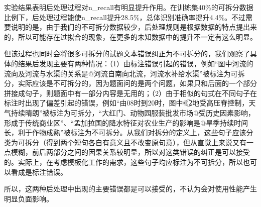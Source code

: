 \documentclass[master, winfont]{njuthesis}
\begin{document}
实验结果表明后处理过程对n\_recall有明显提升作用。在训练集40\%的可拆分数据比例下，后处理过程能使n\_recall提升28.5\%，总体识别准确率提升4.4\%。不过需要说明的是，由于我们的不可拆分数据较少，后处理规则是根据数据的特点提出来的，所以可能存在过拟合的现象，在更多的未知数据中的提升不一定有这么明显。

\begin{center}
\begin{table}[!htbp]
\caption{\label{postprocess} 后处理的影响}
\end{table}
\end{center}

但该过程也同时会将很多可拆分的试题文本错误纠正为不可拆分的，我们观察了具体的结果后发现主要有两种情况：（1）由标注错误引起的错误，例如“图中河流的流向及河流与水渠的关系是@河流自南向北流，河流水补给水渠”被标注为可拆分，实际应该是不可拆分的，因为题面问的是两个问题，如果只和后面的一个部分拼接成句子，则题面中有一部分内容是无用的；（2）由于相似的句式在不同句子在标注时出现了偏差引起的错误，例如“由08时到20时，图中@\textcircled{2}地受高压脊控制，天气持续晴朗”被标注为可拆分，“大红门、动物园服装批发市场@受历史因素影响，形成于传统商业区”、“孟加拉国的降水特征对农业生产的影响是@旱季持续时间长，利于作物成熟”被标注为不可拆分。从我们对拆分的定义上，这些句子应该分类为可拆分（得到两个短句各自有意义且不改变原句意），但从直觉上来说又有一点模糊，前后两部分之间的因果关系较明显，所以对这类错误的纠正是可以接受的。实际上，在考虑模板化工作的需求，这些句子均应标注为不可拆分，所以也可以看成是标注错误。

所以，这两种后处理中出现的主要错误都是可以接受的，不认为会对使用性能产生明显负面影响。
\end{document}
